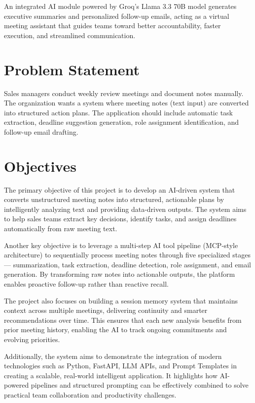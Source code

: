 \documentclass[12pt,a4paper]{article}
\begin{document}
An integrated AI module powered by Groq's Llama 3.3 70B model generates executive summaries and personalized follow-up emails, acting as a virtual meeting assistant that guides teams toward better accountability, faster execution, and streamlined communication.


\section{Problem Statement}

Sales managers conduct weekly review meetings and document notes manually. The organization wants a system where meeting notes (text input) are converted into structured action plans. The application should include automatic task extraction, deadline suggestion generation, role assignment identification, and follow-up email drafting.


\section{Objectives}

The primary objective of this project is to develop an AI-driven system that converts unstructured meeting notes into structured, actionable plans by intelligently analyzing text and providing data-driven outputs. The system aims to help sales teams extract key decisions, identify tasks, and assign deadlines automatically from raw meeting text.

Another key objective is to leverage a multi-step AI tool pipeline (MCP-style architecture) to sequentially process meeting notes through five specialized stages --- summarization, task extraction, deadline detection, role assignment, and email generation. By transforming raw notes into actionable outputs, the platform enables proactive follow-up rather than reactive recall.

The project also focuses on building a session memory system that maintains context across multiple meetings, delivering continuity and smarter recommendations over time. This ensures that each new analysis benefits from prior meeting history, enabling the AI to track ongoing commitments and evolving priorities.

Additionally, the system aims to demonstrate the integration of modern technologies such as Python, FastAPI, LLM APIs, and Prompt Templates in creating a scalable, real-world intelligent application. It highlights how AI-powered pipelines and structured prompting can be effectively combined to solve practical team collaboration and productivity challenges.
\end{document}
